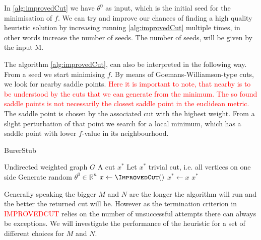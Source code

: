 \documentclass[12pt,a4paper]{article}
\theoremstyle{mythm}
\begin{document}
In \ref{alg:improvedCut} we have $ \theta^0 $ as input, which is the initial seed for the minimisation of $ f $. We can try and improve our chances of finding a high quality
heuristic solution by increasing running \ref{alg:improvedCut} multiple times, in other words increase the number of seeds. The number of seeds, will be given by the input M.

The algorithm \ref{alg:improvedCut}, can also be interpreted in the following way.
From a seed we start minimising $ f $. By means of Goemans-Williamson-type cuts, we look for nearby saddle points. 
\textcolor{red}{Here it is important to note, that nearby is to be understood by the cuts that we can generate from the minimum. The so found saddle points is not necessarily
the closest saddle point in the euclidean metric.}
The saddle point is chosen by the associated cut with the highest weight.
From a slight perturbation of that point we search for a local minimum, which has a saddle point with lower $ f $-value in its neighbourhood.
\begin{algorithm}
\caption{BurerStub}
\label{alg:BurerStub} 
\begin{algorithmic}[1]
\Require Undirected weighted graph $ G $
\Ensure A cut $ x^* $
\State Let $ x^* $ trivial cut, i.e. all vertices on one side
  \State Generate random $ \theta^0 \in \mathbb{R} ^{ n } $ 
  \State $ x \gets \Call{\ImprovedCut} $
    \State $ x^* \gets x $
  \EndIf
\EndFor
\State \Return $ x^* $
\end{algorithmic}
\end{algorithm}
Generally speaking the bigger $ M $ and $ N $ are the longer the algorithm will run and the better the returned cut will be.
However as the termination criterion in \textcolor{red}{IMPROVEDCUT} relies on the number of unsuccessful attempts there can always be exceptions.
We will investigate the performance of the heuristic for a set of different choices for $ M $ and $ N $.
\newpage
\end{document}
